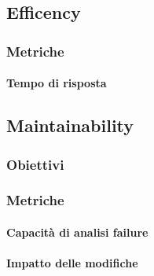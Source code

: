 	\subsection{Efficency}
		\subsubsection{Metriche}
			\paragraph{Tempo di risposta}
			
	\subsection{Maintainability}
		\subsubsection{Obiettivi}
		\subsubsection{Metriche}
			\paragraph{Capacità di analisi failure}
			\paragraph{Impatto delle modifiche}
